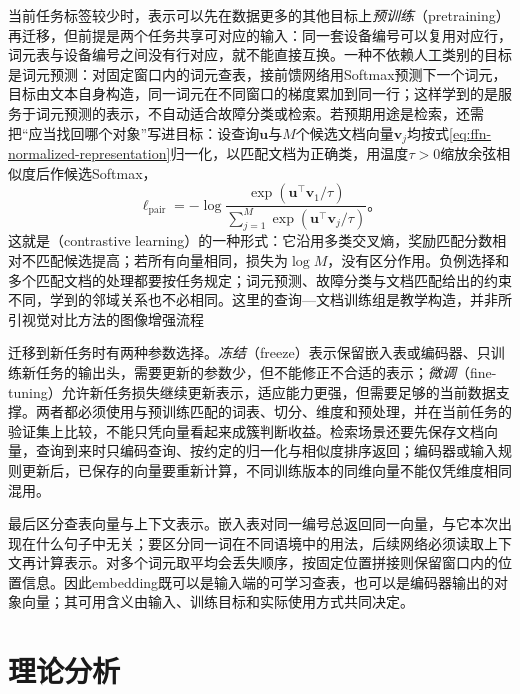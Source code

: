 当前任务标签较少时，表示可以先在数据更多的其他目标上\emph{预训练}（pretraining）再迁移，但前提是两个任务共享可对应的输入：同一套设备编号可以复用对应行，词元表与设备编号之间没有行对应，就不能直接互换。一种不依赖人工类别的目标是词元预测：对固定窗口内的词元查表，接前馈网络用Softmax预测下一个词元，目标由文本自身构造，同一词元在不同窗口的梯度累加到同一行；这样学到的是服务于词元预测的表示，不自动适合故障分类或检索。若预期用途是检索，还需把“应当找回哪个对象”写进目标：设查询$\bm{u}$与$M$个候选文档向量$\bm{v}_j$均按式\eqref{eq:ffn-normalized-representation}归一化，以匹配文档为正确类，用温度$\tau>0$缩放余弦相似度后作候选Softmax，
\begin{equation}
  \ell_{\mathrm{pair}}
  =-\log\frac{\exp(\bm{u}^{\top}\bm{v}_1/\tau)}
  {\sum_{j=1}^{M}\exp(\bm{u}^{\top}\bm{v}_j/\tau)}\text{。}
  \label{eq:ffn-embedding-contrastive}
\end{equation}
这就是（contrastive learning）的一种形式：它沿用多类交叉熵，奖励匹配分数相对不匹配候选提高；若所有向量相同，损失为$\log M$，没有区分作用。负例选择和多个匹配文档的处理都要按任务规定；词元预测、故障分类与文档匹配给出的约束不同，学到的邻域关系也不必相同。这里的查询—文档训练组是教学构造，并非所引视觉对比方法的图像增强流程

迁移到新任务时有两种参数选择。\emph{冻结}（freeze）表示保留嵌入表或编码器、只训练新任务的输出头，需要更新的参数少，但不能修正不合适的表示；\emph{微调}（fine-tuning）允许新任务损失继续更新表示，适应能力更强，但需要足够的当前数据支撑。两者都必须使用与预训练匹配的词表、切分、维度和预处理，并在当前任务的验证集上比较，不能只凭向量看起来成簇判断收益。检索场景还要先保存文档向量，查询到来时只编码查询、按约定的归一化与相似度排序返回；编码器或输入规则更新后，已保存的向量要重新计算，不同训练版本的同维向量不能仅凭维度相同混用。

最后区分查表向量与上下文表示。嵌入表对同一编号总返回同一向量，与它本次出现在什么句子中无关；要区分同一词在不同语境中的用法，后续网络必须读取上下文再计算表示。对多个词元取平均会丢失顺序，按固定位置拼接则保留窗口内的位置信息。因此embedding既可以是输入端的可学习查表，也可以是编码器输出的对象向量；其可用含义由输入、训练目标和实际使用方式共同决定。

\section{理论分析}
\label{sec:ffn-theory}

